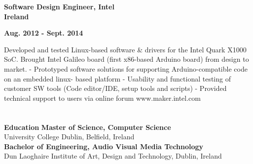 \documentclass[6pt]{article}
\begin{document}
\hspace*{-\parindent}%
\begin{minipage}{20em}
{\bfseries Software Design Engineer, Intel \\
Ireland}
\end{minipage}
\hfill
\begin{minipage}{14em}
{
    \bfseries \hfill Aug. 2012 - Sept. 2014 \\

}
\end{minipage}
\break
\break
Developed and tested Linux-based software \& drivers for the Intel Quark X1000 SoC. Brought Intel
Galileo board (first x86-based Arduino board) from design to market.
- Prototyped software solutions for supporting Arduino-compatible code on an embedded linux-
based platform
- Usability and functional testing of customer SW tools (Code editor/IDE, setup tools and scripts)
- Provided technical support to users via online forum www.maker.intel.com

\section*{}
{\Large \bfseries Education}
\break
\break
{\bfseries Master of Science, Computer Science} \\
University College Dublin, Belfield, Ireland \\
\break
{\bfseries Bachelor of Engineering, Audio Visual Media Technology} \\
Dun Laoghaire Institute of Art, Design and Technology, Dublin, Ireland
\end{document}

